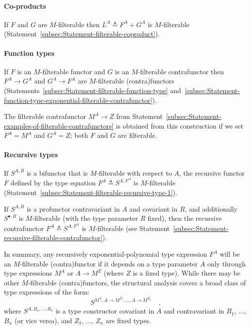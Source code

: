 \paragraph{Co-products}

If $F$ and $G$ are $M$-filterable then $L^{A}\triangleq F^{A}+G^{A}$
is $M$-filterable (Statement~\ref{subsec:Statement-filterable-coproduct}).

\paragraph{Function types}

If $F$ is an $M$-filterable functor and $G$ is an $M$-filterable
contrafunctor then $F^{A}\rightarrow G^{A}$ and $G^{A}\rightarrow F^{A}$
are $M$-filterable (contra)functors (Statements~\ref{subsec:Statement-filterable-function-type}
and~\ref{subsec:Statement-function-type-exponential-filterable-contrafunctor}).

The filterable contrafunctor $M^{A}\rightarrow Z$ from Statement~\ref{subsec:Statement-examples-of-filterable-contrafunctors}
is obtained from this construction if we set $F^{A}=M^{A}$ and $G^{A}=Z$;
both $F$ and $G$ are filterable.

\paragraph{Recursive types}

If $S^{A,R}$ is a bifunctor that is $M$-filterable with respect
to $A$, the recursive functor $F$ defined by the type equation $F^{A}\triangleq S^{A,F^{A}}$
is $M$-filterable (Statement~\ref{subsec:Statement-filterable-recursive-type-1}).

If $S^{A,R}$ is a profunctor contravariant in
$A$ and covariant in $R$, and additionally $S^{\bullet,R}$ is $M$-filterable
(with the type parameter $R$ fixed), then the recursive contrafunctor
$F^{A}\triangleq S^{A,F^{A}}$ is $M$-filterable (see Statement~\ref{subsec:Statement-recursive-filterable-contrafunctor}).

In summary, any recursively exponential-polynomial type expression
$F^{A}$ will be an $M$-filterable (contra)functor if it depends
on a type parameter $A$ only through type expressions $M^{A}$ or
$A\rightarrow M^{Z}$ (where $Z$ is a fixed type). While there may
be other $M$-filterable (contra)functors, the structural analysis
covers a broad class of type expressions of the form:
\[
S^{M^{A},A\rightarrow M^{Z_{1}},...,A\rightarrow M^{Z_{n}}}\quad,
\]
where $S^{A,B_{1},...,B_{n}}$ is a type constructor covariant in
$A$ and contravariant in $B_{1}$, ..., $B_{n}$ (or vice versa),
and $Z_{1}$, ..., $Z_{n}$ are fixed types. 

